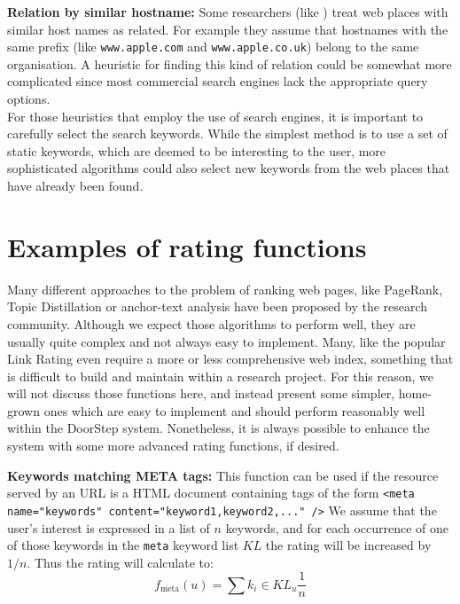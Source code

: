 \documentclass[a4paper]{danarticle}
\theoremstyle{remark}
\begin{document}
    \textbf{Relation by similar hostname:} Some researchers (like 
    \cite[Link Affiliation]{experts}) 
    treat web places with similar host names as related. For example they 
    assume that hostnames with the same prefix (like \verb$www.apple.com$ and
    \verb$www.apple.co.uk$) belong to the same organisation. A heuristic for 
    finding this kind of relation could be somewhat more complicated since most 
    commercial search engines lack the appropriate query options.
    \\
    
    For those heuristics that employ the use of search engines, it is important 
    to carefully select the search keywords. While the simplest method is to use 
    a set of static keywords, which are deemed to be interesting to the user, 
    more sophisticated algorithms could also select new keywords from the web 
    places that have already been found.
  \section{Examples of rating functions}
    \label{rateexample}
    Many different approaches to the problem of ranking web pages, 
    like PageRank\cite{page}, Topic Distillation\cite{kleinberg} or
    anchor-text analysis\cite{chakrabarti} have been proposed by the research
    community. Although we expect those algorithms to perform well, they are
    usually quite complex and not always easy to implement.
    Many, like the popular Link Rating\cite{page}\cite{kleinberg}
    even require a more or less comprehensive web index, something that is difficult 
    to build and maintain within a research project. For this reason, we will not 
    discuss those functions here, and instead present some simpler, home-grown 
    ones which are easy to implement and should perform reasonably well 
    within the DoorStep system. Nonetheless, it is always possible to enhance 
    the system with some more advanced rating functions, if desired.
  
    \textbf{Keywords matching META tags:} This function can be used if the
    resource served by an URL is a HTML document containing tags of the form
    \verb$<meta name="keywords" content="keyword1,keyword2,..." />$ 
    We assume that the user's interest is expressed in a list of $ n $ keywords,
    and for each occurrence of one of those keywords in the \verb$meta$
    keyword list $ KL $ the rating will be increased by $ 1/n $. Thus
    the rating will calculate to:
    \[
      f_{\mbox{meta}}(u) = \sum{k_i \in KL_u} \frac{1}{n}
    \]
    \\
    
\end{document}
